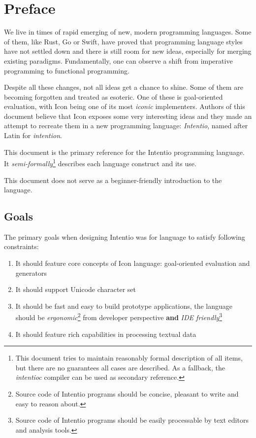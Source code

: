 \chapter{Preface}

We live in times of rapid emerging of new, modern programming languages. Some of them, like Rust\cite{TheRustProgrammingLanguage}, Go\cite{TheGoProgrammingLanguage} or Swift\cite{TheSwiftProgrammingLanguage}, have proved that programming language styles have not settled down and there is still room for new ideas, especially for merging existing paradigms. Fundamentally, one can observe a shift from imperative programming to functional programming.

Despite all these changes, not all ideas get a chance to shine. Some of them are becoming forgotten and treated as esoteric. One of these is goal-oriented evaluation, with Icon\cite{TheIconProgrammingLanguage} being one of its most \emph{iconic} implementers. Authors of this document believe that Icon exposes some very interesting ideas and they made an attempt to recreate them in a new programming language: \emph{Intentio}, named after Latin for \emph{intention}.

This document is the primary reference for the Intentio programming language. It \emph{semi-formally}\footnote{This document tries to maintain reasonably formal description of all items, but there are no guarantees all cases are described. As a fallback, the \emph{intentioc}\cite{intentioc} compiler can be used as secondary reference.} describes each language construct and its use.

This document does not serve as a beginner-friendly introduction to the language.

\section*{Goals}

The primary goals when designing Intentio was for language to satisfy following constraints:
\begin{enumerate}
  \item It should feature core concepts of Icon language: goal-oriented evaluation and generators
  \item It should support Unicode character set
  \item It should be fast and easy to build prototype applications, the language should be \emph{ergonomic}\footnote{Source code of Intentio programs should be concise, pleasant to write and easy to reason about.} from developer perspective \textbf{and} \emph{IDE friendly}\footnote{Source code of Intentio programs should be easily processable by text editors and analysis tools.}
  \item It should feature rich capabilities in processing textual data
\end{enumerate}


